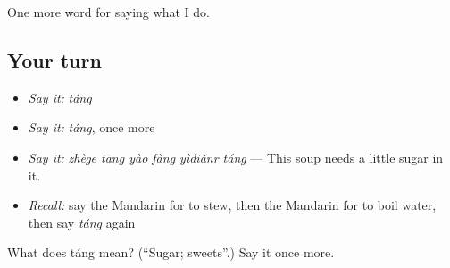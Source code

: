 \begin{grammarlens}[title={What you've built}]
One more word for saying what I do.
\end{grammarlens}

\subsection*{Your turn}
\begin{itemize}
\raggedright
  \item \emph{Say it:} \emph{táng}
  \item \emph{Say it:} \emph{táng}, once more
  \item \emph{Say it:} \emph{zhège tāng yào fàng yìdiǎnr táng} — This soup needs a little sugar in it.
  \item \emph{Recall:} say the Mandarin for to stew, then the Mandarin for to boil water, then say \emph{táng} again
\end{itemize}

\begin{tcolorbox}[breakable,colback=teal!4,colframe=teal!35!black,title={Before you move on}]
What does táng mean? (\textquotedblleft{}Sugar; sweets\textquotedblright{}.) Say it once more.
\end{tcolorbox}
